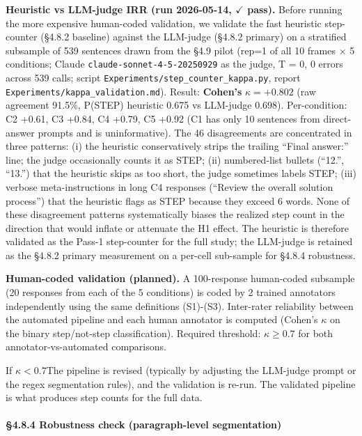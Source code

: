 \documentclass{article}
\begin{document}
\textbf{Heuristic vs LLM-judge IRR (run 2026-05-14, \ensuremath{\checkmark} pass).} Before
running the more expensive human-coded validation, we validate the fast
heuristic step-counter (\S{}4.8.2 baseline) against the LLM-judge (\S{}4.8.2
primary) on a stratified subsample of 539 sentences drawn from the \S{}4.9
pilot (rep=1 of all 10 frames \ensuremath{\times} 5 conditions; Claude
\texttt{claude-sonnet-4-5-20250929} as the judge, T = 0, 0 errors across
539 calls; script \texttt{Experiments/step\_counter\_kappa.py}, report
\texttt{Experiments/kappa\_validation.md}). Result: \textbf{Cohen's}
\(\kappa = + 0.802\) (raw agreement 91.5\%, P(STEP) heuristic 0.675 vs
LLM-judge 0.698). Per-condition: C2 +0.61, C3 +0.84, C4 +0.79, C5 +0.92
(C1 has only 10 sentences from direct-answer prompts and is
uninformative). The 46 disagreements are concentrated in three patterns:
(i) the heuristic conservatively strips the trailing ``Final answer:''
line; the judge occasionally counts it as STEP; (ii) numbered-list
bullets (``12.'', ``13.'') that the heuristic skips as too short, the
judge sometimes labels STEP; (iii) verbose meta-instructions in long C4
responses (``Review the overall solution process'') that the heuristic
flags as STEP because they exceed 6 words. None of these disagreement
patterns systematically biases the realized step count in the direction
that would inflate or attenuate the H1 effect. The heuristic is
therefore validated as the Pass-1 step-counter for the full study; the
LLM-judge is retained as the \S{}4.8.2 primary measurement on a per-cell
sub-sample for \S{}4.8.4 robustness.

\textbf{Human-coded validation (planned).} A 100-response human-coded
subsample (20 responses from each of the 5 conditions) is coded by 2
trained annotators independently using the same definitions (S1)-(S3).
Inter-rater reliability between the automated pipeline and each human
annotator is computed (Cohen's \(\kappa\) on the binary step/not-step
classification). Required threshold: \(\kappa \geq 0.7\) for both
annotator-vs-automated comparisons.

If \(\kappa < 0.7\)The pipeline is revised (typically by adjusting the
LLM-judge prompt or the regex segmentation rules), and the validation is
re-run. The validated pipeline is what produces step counts for the full
data.

\paragraph{\S{}4.8.4 Robustness check (paragraph-level
segmentation)}\label{robustness-check-paragraph-level-segmentation}
\end{document}
